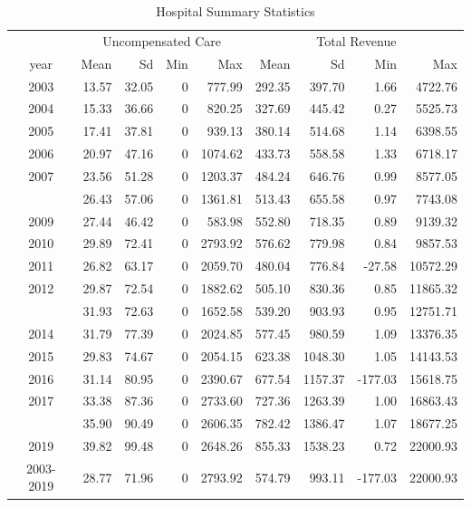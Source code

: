 \documentclass[
  12pt,
]{article}
\begin{document}
\begin{longtable}[t]{crrrrrrrr}
\caption{\label{tab:Tab-1}Hospital Summary Statistics}\\
\toprule
\multicolumn{1}{c}{ } & \multicolumn{4}{c}{Uncompensated Care} & \multicolumn{4}{c}{Total Revenue} \\
\cmidrule(l{3pt}r{3pt}){2-5} \cmidrule(l{3pt}r{3pt}){6-9}
year & Mean & Sd & Min & Max & Mean & Sd & Min & Max\\
\midrule
2003 & 13.57 & 32.05 & 0 & 777.99 & 292.35 & 397.70 & 1.66 & 4722.76\\
2004 & 15.33 & 36.66 & 0 & 820.25 & 327.69 & 445.42 & 0.27 & 5525.73\\
2005 & 17.41 & 37.81 & 0 & 939.13 & 380.14 & 514.68 & 1.14 & 6398.55\\
2006 & 20.97 & 47.16 & 0 & 1074.62 & 433.73 & 558.58 & 1.33 & 6718.17\\
2007 & 23.56 & 51.28 & 0 & 1203.37 & 484.24 & 646.76 & 0.99 & 8577.05\\
\addlinespace
2008 & 26.43 & 57.06 & 0 & 1361.81 & 513.43 & 655.58 & 0.97 & 7743.08\\
2009 & 27.44 & 46.42 & 0 & 583.98 & 552.80 & 718.35 & 0.89 & 9139.32\\
2010 & 29.89 & 72.41 & 0 & 2793.92 & 576.62 & 779.98 & 0.84 & 9857.53\\
2011 & 26.82 & 63.17 & 0 & 2059.70 & 480.04 & 776.84 & -27.58 & 10572.29\\
2012 & 29.87 & 72.54 & 0 & 1882.62 & 505.10 & 830.36 & 0.85 & 11865.32\\
\addlinespace
2013 & 31.93 & 72.63 & 0 & 1652.58 & 539.20 & 903.93 & 0.95 & 12751.71\\
2014 & 31.79 & 77.39 & 0 & 2024.85 & 577.45 & 980.59 & 1.09 & 13376.35\\
2015 & 29.83 & 74.67 & 0 & 2054.15 & 623.38 & 1048.30 & 1.05 & 14143.53\\
2016 & 31.14 & 80.95 & 0 & 2390.67 & 677.54 & 1157.37 & -177.03 & 15618.75\\
2017 & 33.38 & 87.36 & 0 & 2733.60 & 727.36 & 1263.39 & 1.00 & 16863.43\\
\addlinespace
2018 & 35.90 & 90.49 & 0 & 2606.35 & 782.42 & 1386.47 & 1.07 & 18677.25\\
2019 & 39.82 & 99.48 & 0 & 2648.26 & 855.33 & 1538.23 & 0.72 & 22000.93\\
2003-2019 & 28.77 & 71.96 & 0 & 2793.92 & 574.79 & 993.11 & -177.03 & 22000.93\\
\bottomrule
\end{longtable}
\end{document}
